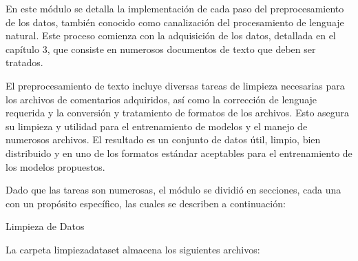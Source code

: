 En este módulo se detalla la implementación de cada paso del preprocesamiento de los datos, también conocido como canalización del procesamiento de lenguaje natural. Este proceso comienza con la adquisición de los datos, detallada en el capítulo 3, que consiste en numerosos documentos de texto que deben ser tratados.


El preprocesamiento de texto incluye diversas tareas de limpieza necesarias para los archivos de comentarios adquiridos, así como la corrección de lenguaje requerida y la conversión y tratamiento de formatos de los archivos. Esto asegura su limpieza y utilidad para el entrenamiento de modelos y el manejo de numerosos archivos. El resultado es un conjunto de datos útil, limpio, bien distribuido y en uno de los formatos estándar aceptables para el entrenamiento de los modelos propuestos.


Dado que las tareas son numerosas, el módulo se dividió en secciones, cada una con un propósito específico, las cuales se describen a continuación:

Limpieza de Datos

La carpeta limpiezadataset almacena los siguientes archivos:


